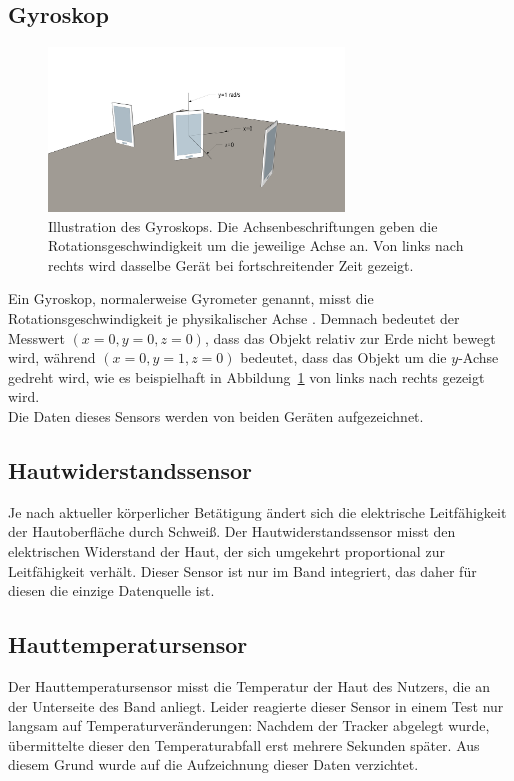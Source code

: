 \subsection{Gyroskop}
\begin{figure}
\centering
\includegraphics[clip=true,trim=0mm 0mm 0mm 0mm, width=0.7\textwidth]{img/gyroscope}
\caption[Illustration des Gyroskops]{Illustration des Gyroskops. Die Achsenbeschriftungen geben die Rotationsgeschwindigkeit um die jeweilige Achse an. Von links nach rechts wird dasselbe Gerät bei fortschreitender Zeit gezeigt.}
\label{fig:gyroscope}
\end{figure}
Ein Gyroskop, normalerweise Gyrometer genannt, misst die Rotationsgeschwindigkeit je physikalischer Achse \cite{SensorsOverview}. Demnach bedeutet der Messwert $(x=0, y=0, z=0)$, dass das Objekt relativ zur Erde nicht bewegt wird, während $(x=0, y=1, z=0)$ bedeutet, dass das Objekt um die $y$-Achse gedreht wird, wie es beispielhaft in Abbildung~\ref{fig:gyroscope} von links nach rechts gezeigt wird. \\
Die Daten dieses Sensors werden von beiden Geräten aufgezeichnet.

\subsection{Hautwiderstandssensor}
Je nach aktueller körperlicher Betätigung ändert sich die elektrische Leitfähigkeit der Hautoberfläche durch Schweiß. Der Hautwiderstandssensor misst den elektrischen Widerstand der Haut, der sich umgekehrt proportional zur Leitfähigkeit verhält.
Dieser Sensor ist nur im Band integriert, das daher für diesen die einzige Datenquelle ist.

\subsection{Hauttemperatursensor}
Der Hauttemperatursensor misst die Temperatur der Haut des Nutzers, die an der Unterseite des Band anliegt. Leider reagierte dieser Sensor in einem Test nur langsam auf Temperaturveränderungen: Nachdem der Tracker abgelegt wurde, übermittelte dieser den Temperaturabfall erst mehrere Sekunden später. Aus diesem Grund wurde auf die Aufzeichnung dieser Daten verzichtet.

